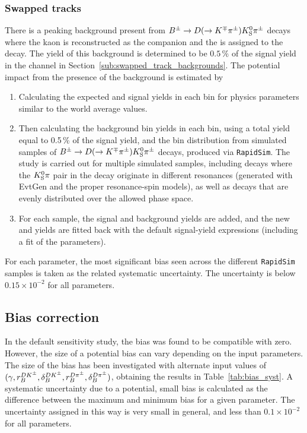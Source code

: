 \subsubsection{Swapped tracks} %
\label{ssub:swapped_tracks_systematic}

There is a peaking background present from ${{{B}^\pm}\rightarrow {\ensuremath{D}}(\rightarrow {\ensuremath{{K}^\mp}}{\ensuremath{{\pi}^\pm}}){{K}^0_{\mathrm{S}}}{{\pi}^\pm}}$ decays where the kaon is reconstructed as the companion and the \KS is assigned to the \D decay. The yield of this background is determined to be $0.5\,\%$ of the signal yield in the \BtoDK channel in Section~\ref{sub:swapped_track_backgrounds}. The potential impact from the presence of the background is estimated by 
\begin{enumerate}
    \item Calculating the expected \BtoDpi and \BtoDK signal yields in each bin for physics parameters similar to the world average values.
    \item Then calculating the background bin yields in each \BtoDK bin, using a total yield equal to 0.5\,\% of the signal yield, and the bin distribution from simulated samples of ${{B}^\pm}\rightarrow {\ensuremath{D}}(\rightarrow {\ensuremath{{K}^\mp}}{\ensuremath{{\pi}^\pm}}){{K}^0_{\mathrm{S}}}{{\pi}^\pm}$ decays, produced via \texttt{RapidSim}. The study is carried out for multiple simulated samples, including decays where the ${{K}^0_{\mathrm{S}}}\pi$ pair in the \B decay originate in different \Kstar resonances (generated with EvtGen and the proper resonance-spin models), as well as \B decays that are evenly distributed over the allowed phase space.
    \item For each sample, the signal and background yields are added,  and the new \BtoDpi and \BtoDK yields are fitted back with the default signal-yield expressions (including a fit of the \Fi parameters).
\end{enumerate}
For each parameter, the most significant bias seen across the different \texttt{RapidSim} samples is taken as the related systematic uncertainty. The uncertainty is below $0.15\times 10^{-2}$ for all parameters.




\subsection{Bias correction} %
\label{sub:bias_correction_syst}{}
In the default sensitivity study, the bias was found to be compatible with zero.  However, the size of a potential bias can vary depending on the input parameters. The size of the bias has been investigated with alternate input values of $(\gamma, r_B^{{{D}{{K}^\pm}}}, \delta_B^{{{D}{{K}^\pm}}}, r_B^{D\pi^\pm}, \delta_B^{D\pi^\pm})$, obtaining the results in Table~\ref{tab:bias_syst}. A systematic uncertainty due to a potential, small bias is calculated as the difference between the maximum and minimum bias for a given parameter. The uncertainty assigned in this way is very small in general, and less than $0.1\times 10^{-2}$ for all parameters.


